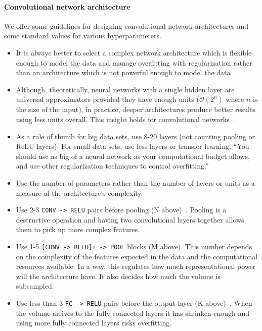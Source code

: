 \paragraph{Convolutional network architecture}
We offer some guidelines for designing convolutional network architectures and some standard values for various hyperparameters.

\begin{itemize}
	\item It is always better to select a complex network architecture which is flexible enough to model the data and manage overfitting with regularization rather than an architecture which is not powerful enough to model the data~\cite{Ng2014, Krizhevsky2012}. 

	\item Although, theoretically, neural networks with a single hidden layer are universal approximators provided they have enough units ($\mathcal{O}(2^n)$ where $n$ is the size of the input), in practice, deeper architectures produce better results using less units overall. This insight holds for convolutional networks~\cite{Bengio2014}.

	\item As a rule of thumb for big data sets, use 8-20 layers (not counting pooling or ReLU layers). For small data sets, use less layers or transfer learning. ``You should use as big of a neural network as your computational budget allows, and use other regularization techniques to control overfitting.''~\cite{Karpathy2015}

	\item Use the number of parameters rather than the number of layers or units as a measure of the architecture's complexity.

	\item Use 2-3 \texttt{CONV -> RELU} pairs before pooling (N above)~\cite{Karpathy2015}. Pooling is a destructive operation and having two convolutional layers together allows them to pick up more complex features.

	\item Use 1-5 \texttt{[CONV -> RELU]+ -> POOL} blocks (M above). This number depends on the complexity of the features expected in the data and the computational resources available. In a way, this regulates how much representational power will the architecture have. It also decides how much the volume is subsampled.

	\item Use less than 3 \texttt{FC -> RELU} pairs before the output layer (K above)~\cite{Karpathy2015}. When the volume arrives to the fully connected layers it has shrinken enough and using more fully connected layers risks overfitting.


\end{itemize}

